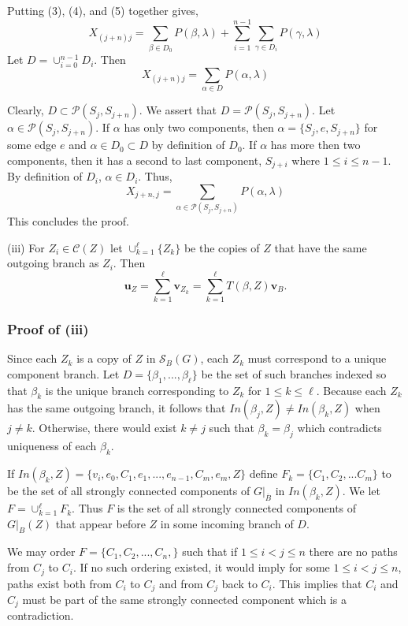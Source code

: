 \documentclass{paper}
\begin{document}
Putting (3), (4), and (5) together gives,
\[
X_{(j+n)j} = \sum_{\beta \in D_0} P(\beta,\lambda) + \sum_{i=1}^{n-1}\sum_{\gamma \in D_i}P(\gamma,\lambda)
\]
Let $D = \cup_{i=0}^{n-1}D_i$. Then
\[
X_{(j+n)j} = \sum_{\alpha \in D}P(\alpha,\lambda)
\]

Clearly, $D \subset \mathcal{P}(S_j,S_{j+n})$. We assert that $D = \mathcal{P}(S_j,S_{j+n})$.  Let $\alpha \in \mathcal{P}(S_j,S_{j+n})$. If $\alpha$ has only two components, then $\alpha = \{S_j,e,S_{j+n}\}$ for some edge $e$ and $\alpha \in D_0 \subset D$ by definition of $D_0$. If $\alpha$ has more then two components, then it has a second to last component, $S_{j+i}$ where $ 1 \leq i \leq n-1 $. By definition of $D_i$, $\alpha \in D_i$. Thus,
\[
X_{j+n,j} = \sum_{\alpha \in \mathcal{P}(S_j,S_{j+n})}P(\alpha,\lambda)
\]
This concludes the proof.

(iii) For $Z_i\in\mathcal{C}(Z)$ let $\cup_{k=1}^\ell\{Z_k\}$ be the copies of $Z$ that have the same outgoing branch as $Z_i$. Then
\[
\mathbf{u}_Z=\sum_{k=1}^{\ell}\mathbf{v}_{Z_k}=\sum_{k=1}^{\ell}T(\beta,Z)\mathbf{v}_B.
\]

\subsubsection*{Proof of (iii)}

Since each $Z_k$ is a copy of $Z$ in $\mathcal{S}_B(G)$, each $Z_k$ must correspond to a unique component branch. Let $D = \{\beta_1,...,\beta_{\ell}\}$ be the set of such branches indexed so that $\beta_k$ is the unique branch corresponding to $Z_k$ for $1 \leq k \leq \ell$. Because each $Z_k$ has the same outgoing branch, it follows that $In(\beta_{j},Z) \neq In(\beta_{k},Z)$ when $j \neq k$. Otherwise, there would exist $k \neq j$ such that $\beta_k = \beta_j$ which contradicts uniqueness of each $\beta_k$.

If $In(\beta_k,Z) = \{v_i,e_0,C_1,e_1,...,e_{n-1}, C_m, e_m, Z \}$ define $F_k = \{C_1, C_2,...C_m \}$ 
to be the set of all strongly connected components of $G|_{\overline{B}}$ in $In(\beta_k,Z)$.
 We let $F = \cup_{k=1}^{\ell}F_k$. Thus $F$ is the set of all strongly connected components of $G|_B(Z)$ that appear before $Z$ in some incoming branch of $D$.

We may order $F = \{C_1, C_2, ..., C_n,\}$ such that if $1 \leq i < j \leq n$ there are no paths from $C_j$ to $C_i$. If no such ordering existed, it would imply for some $1 \leq i < j \leq n$, paths exist both from $C_i$ to $C_j$ and from $C_j$ back to $C_i$. This implies that $C_i$ and $C_j$ must be part of the same strongly connected component which is a contradiction.
\end{document}
